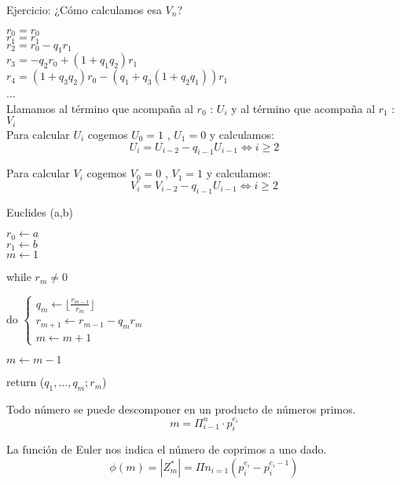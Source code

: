 \begin{enumerate}
\begin{itemize}
	\end{itemize}
	
	Ejercicio: ¿Cómo calculamos esa $V_n$?
	
	 $r_0 = r_0$\\ $r_1 = r_1$\\$r_2 = r_0 -q_1r_1$\\$r_3 = -q_2r_0 + (1+q_1q_2)r_1$\\ $r_4 = (1+ q_3q_2)r_0 -(q_1 +q_3(1+q_2q_1))r_1$\\ ... \\ Llamamos al término que acompaña al $r_0$ : $U_i$ y al término que acompaña al $r_1$ : $V_i$\\ 
	 
	 Para calcular $U_i$ cogemos $U_0=1$ , $U_1 = 0$ y calculamos:
	 $$U_i = U_{i-2} - q_{i-1}U_{i-1} \iff i\geq 2$$
	
	 Para calcular $V_i$ cogemos $V_0=0$ , $V_1 = 1$ y calculamos:
	 $$V_i = V_{i-2} - q_{i-1}U_{i-1} \iff i\geq 2$$
	 
	 \begin{example}
	 Euclides (a,b)	 
	 	
	 	$r_0 \leftarrow a$\\$r_1\leftarrow b$\\$m\leftarrow 1$
	 	
	 	while $r_m \neq 0$
	 	
	 	 do 
	 	$\begin{cases}
	 		q_m \leftarrow \lfloor\frac{r_{m-1}}{r_m}\rfloor\\ r_{m+1} \leftarrow r_{m-1} - q_mr_m\\m\leftarrow m +1
	 		
	 	\end{cases}$
	 	
	 	$m\leftarrow m-1$
	 	
	 	return ($q_1,...,q_m; r_m$)
	 \end{example}
	 
\end{enumerate}
 \begin{theorem}
 	Todo número se puede descomponer en un producto de números primos.
 	$$m = \Pi^{n}_{i-1} \cdot p^{e_i}_{i}$$
 	
 \end{theorem} 
 
 \begin{theorem}
 	La función de Euler nos indica el número de coprimos a uno dado.
 	$$\phi(m) = |Z^{*}_m| = \Pi{n}_{i=1} (p^{e_i}_i - p^{e_i-1}_i)$$
 	
 \end{theorem}
 

